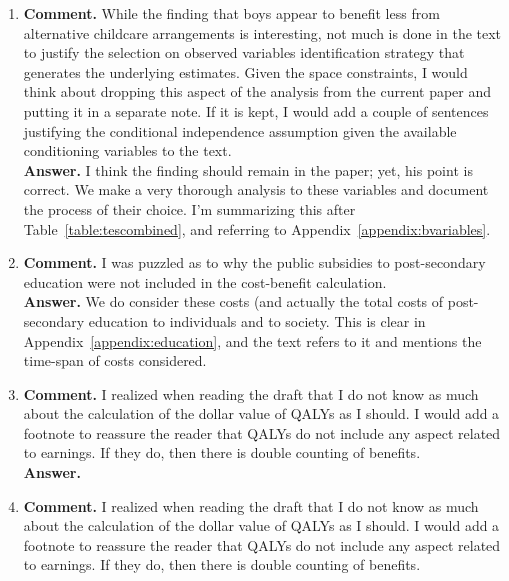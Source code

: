 \begin{enumerate}
\item
\noindent \textbf{Comment.} While the finding that boys appear to benefit less from alternative childcare arrangements is interesting, not much is done in the text to justify the selection on observed variables identification strategy that generates the underlying estimates. Given the space constraints, I would think about dropping this aspect of the analysis from the current paper and putting it in a separate note. If it is kept, I would add a couple of sentences justifying the conditional independence assumption given the available conditioning variables to the text.\\ 

\noindent \textbf{Answer.} I think the finding should remain in the paper; yet, his point is correct. We make a very thorough analysis to these variables and document the process of their choice. I'm summarizing this after Table~\ref{table:tescombined}, and referring to Appendix~\ref{appendix:bvariables}.\\

\item
\noindent \textbf{Comment.} I was puzzled as to why the public subsidies to post-secondary education were not included in the cost-benefit calculation.\\

\noindent \textbf{Answer.} We do consider these costs (and actually the total costs of post-secondary education to individuals and to society. This is clear in Appendix~\ref{appendix:education}, and the text refers to it and mentions the time-span of costs considered.

\item 
\noindent \textbf{Comment.} I realized when reading the draft that I do not know as much about the calculation of the dollar value of QALYs as I should. I would add a footnote to reassure the reader that QALYs do not include any aspect related to earnings. If they do, then there is double counting of benefits.\\
\noindent \textbf{Answer.}\\

\item 
\noindent \textbf{Comment.} I realized when reading the draft that I do not know as much about the calculation of the dollar value of QALYs as I should. I would add a footnote to reassure the reader that QALYs do not include any aspect related to earnings. If they do, then there is double counting of benefits.\\


\end{enumerate}
